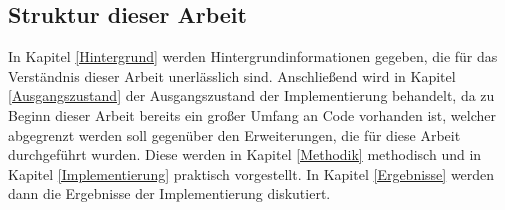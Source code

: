 \subsection{Struktur dieser Arbeit}
In Kapitel \ref{Hintergrund} werden Hintergrundinformationen gegeben, die für das Verständnis dieser Arbeit unerlässlich sind. Anschließend wird in Kapitel \ref{Ausgangszustand} der Ausgangszustand der Implementierung behandelt, da zu Beginn dieser Arbeit bereits ein großer Umfang an Code vorhanden ist, welcher abgegrenzt werden soll gegenüber den Erweiterungen, die für diese Arbeit durchgeführt wurden. Diese werden in Kapitel \ref{Methodik} methodisch und in Kapitel \ref{Implementierung} praktisch vorgestellt. In Kapitel \ref{Ergebnisse} werden dann die Ergebnisse der Implementierung diskutiert.